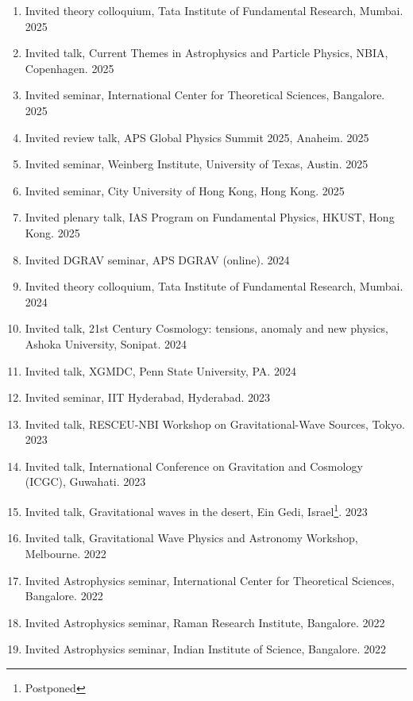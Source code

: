 \documentclass{article}
\newlength{\cvindent}
\newenvironment{cvlist}{%
  \begin{list}{}{%
    \setlength{\leftmargin}{\cvindent}%
    \setlength{\rightmargin}{0pt}%
    \setlength{\topsep}{0pt}%
    \setlength{\partopsep}{0pt}%
    \setlength{\parsep}{0pt}%
    \setlength{\itemsep}{0pt}%
  }%
  \item\relax
}{%
  \end{list}
}
\begin{document}
\begin{cvlist}
	\begin{enumerate}
	       \item Invited theory colloquium, Tata Institute of Fundamental Research, Mumbai. \hfill 2025
	       \item Invited talk, Current Themes in Astrophysics and Particle Physics, NBIA, Copenhagen. \hfill 2025
	       \item Invited seminar, International Center for Theoretical Sciences, Bangalore. \hfill 2025
	       \item Invited review talk, APS Global Physics Summit 2025, Anaheim. \hfill 2025
	       \item Invited seminar, Weinberg Institute, University of Texas, Austin. \hfill 2025
	       \item Invited seminar, City University of Hong Kong, Hong Kong. \hfill 2025
	       \item Invited plenary talk, IAS Program on Fundamental Physics, HKUST, Hong Kong. \hfill 2025
	       \item Invited DGRAV seminar, APS DGRAV (online). \hfill 2024
	       \item Invited theory colloquium, Tata Institute of Fundamental Research, Mumbai. \hfill 2024
	       \item Invited talk, 21st Century Cosmology: tensions, anomaly and new physics, Ashoka University, Sonipat. \hfill 2024
	       \item Invited talk, XGMDC, Penn State University, PA. \hfill 2024
	       \item Invited seminar, IIT Hyderabad, Hyderabad. \hfill 2023
	       \item Invited talk, RESCEU-NBI Workshop on Gravitational-Wave Sources, Tokyo. \hfill 2023
	       \item Invited talk, International Conference on Gravitation and Cosmology (ICGC), Guwahati. \hfill 2023
	       \item Invited talk, Gravitational waves in the desert, Ein Gedi, Israel\footnote{Postponed}. \hfill 2023
	       \item Invited talk, Gravitational Wave Physics and Astronomy Workshop, Melbourne. \hfill 2022
	       \item Invited Astrophysics seminar, International Center for Theoretical Sciences, Bangalore. \hfill 2022
	       \item Invited Astrophysics seminar, Raman Research Institute, Bangalore. \hfill 2022
	       \item Invited Astrophysics seminar, Indian Institute of Science, Bangalore. \hfill 2022

\end{enumerate}
\end{cvlist}
\end{document}
